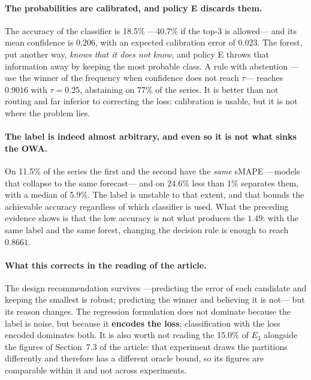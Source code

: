 \paragraph{The probabilities are calibrated, and policy E discards them.} The accuracy of
the classifier is 18.5\% ---40.7\% if the top-3 is allowed--- and its mean confidence is
$0.206$, with an expected calibration error of $0.023$. The forest, put another way,
\emph{knows that it does not know}, and policy E throws that information away by keeping
the most probable class. A rule with abstention ---use the winner of the frequency when
confidence does not reach $\tau$--- reaches $0.9016$ with $\tau=0.25$, abstaining on 77\%
of the series. It is better than not routing and far inferior to correcting the loss:
calibration is usable, but it is not where the problem lies.

\paragraph{The label is indeed almost arbitrary, and even so it is not what sinks the
OWA.} On 11.5\% of the series the first and the second have the \emph{same} sMAPE
---models that collapse to the same forecast--- and on 24.6\% less than 1\% separates
them, with a median of 5.9\%. The label is unstable to that extent, and that bounds the
achievable accuracy regardless of which classifier is used. What the preceding evidence
shows is that the low accuracy is not what produces the $1.49$: with the same label and
the same forest, changing the decision rule is enough to reach $0.8661$.

\paragraph{What this corrects in the reading of the article.} The design recommendation
survives ---predicting the error of each candidate and keeping the smallest is robust;
predicting the winner and believing it is not--- but its reason changes. The regression
formulation does not dominate because the label is noise, but because it \textbf{encodes
the loss}; classification with the loss encoded dominates both. It is also worth not
reading the 15.0\% of $E_3$ alongside the figures of Section~7.3 of the article: that
experiment draws the partitions differently and therefore has a different oracle bound,
so its figures are comparable within it and not across experiments.


